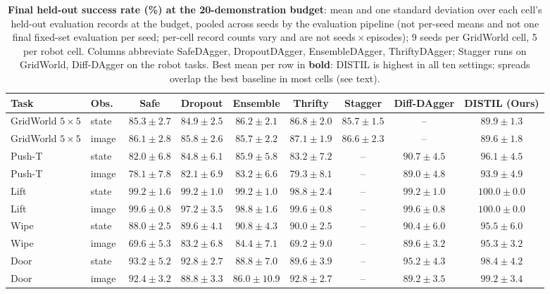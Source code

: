 \documentclass[letterpaper]{article} %
\begin{document}
\begin{table}[t]
\centering
\small
\setlength{\tabcolsep}{4pt}
\caption{\textbf{Final held-out success rate (\%) at the 20-demonstration
budget}: mean and one standard deviation over each cell's held-out
evaluation records at the budget, pooled across seeds by the evaluation
pipeline (not per-seed means and not one final fixed-set evaluation per
seed; per-cell record counts vary and are not
seeds\,$\times$\,episodes); 9 seeds per GridWorld cell, 5 per robot cell.
Columns abbreviate SafeDAgger, DropoutDAgger, EnsembleDAgger,
ThriftyDAgger; Stagger runs on GridWorld, Diff-DAgger on the robot tasks.
Best mean per row in \textbf{bold}: DISTIL is highest in all ten settings;
spreads overlap the best baseline in most cells (see text).}
\label{tab:main}
\begin{tabular}{llccccccc}
\toprule
Task & Obs.\ & Safe & Dropout & Ensemble & Thrifty & Stagger & Diff-DAgger & DISTIL (Ours) \\
\midrule
GridWorld $5{\times}5$ & state & $85.3 \pm 2.7$ & $84.9 \pm 2.5$ & $86.2 \pm 2.1$ & $86.8 \pm 2.0$ & $85.7 \pm 1.5$ & -- &$\mathbf{89.9 \pm 1.3}$ \\
GridWorld $5{\times}5$ & image & $86.1 \pm 2.8$ & $85.8 \pm 2.6$ & $85.7 \pm 2.2$ & $87.1 \pm 1.9$ & $86.6 \pm 2.3$ & -- &$\mathbf{89.6 \pm 1.8}$ \\
\addlinespace
Push-T & state & $82.0 \pm 6.8$ & $84.8 \pm 6.1$ & $85.9 \pm 5.8$ & $83.2 \pm 7.2$ & -- &$90.7 \pm 4.5$ & $\mathbf{96.1 \pm 4.5}$ \\
Push-T & image & $78.1 \pm 7.8$ & $82.1 \pm 6.9$ & $83.2 \pm 6.6$ & $79.3 \pm 8.1$ & -- &$89.0 \pm 4.8$ & $\mathbf{93.9 \pm 4.9}$ \\
\addlinespace
Lift & state & $99.2 \pm 1.6$ & $99.2 \pm 1.0$ & $99.2 \pm 1.0$ & $98.8 \pm 2.4$ & -- &$99.2 \pm 1.0$ & $\mathbf{100.0 \pm 0.0}$ \\
Lift & image & $99.6 \pm 0.8$ & $97.2 \pm 3.5$ & $98.8 \pm 1.6$ & $99.6 \pm 0.8$ & -- &$99.6 \pm 0.8$ & $\mathbf{100.0 \pm 0.0}$ \\
\addlinespace
Wipe & state & $88.0 \pm 2.5$ & $89.6 \pm 4.1$ & $90.8 \pm 4.3$ & $90.0 \pm 2.5$ & -- &$90.4 \pm 6.0$ & $\mathbf{95.5 \pm 6.0}$ \\
Wipe & image & $69.6 \pm 5.3$ & $83.2 \pm 6.8$ & $84.4 \pm 7.1$ & $69.2 \pm 9.0$ & -- &$89.6 \pm 3.2$ & $\mathbf{95.3 \pm 3.2}$ \\
\addlinespace
Door & state & $93.2 \pm 5.2$ & $92.8 \pm 2.7$ & $88.8 \pm 7.0$ & $89.6 \pm 3.9$ & -- &$95.2 \pm 4.3$ & $\mathbf{98.4 \pm 4.2}$ \\
Door & image & $92.4 \pm 3.2$ & $88.8 \pm 3.3$ & $86.0 \pm 10.9$ & $92.8 \pm 2.7$ & -- &$89.2 \pm 3.5$ & $\mathbf{99.2 \pm 3.4}$ \\
\bottomrule
\end{tabular}
\end{table}
\end{document}
